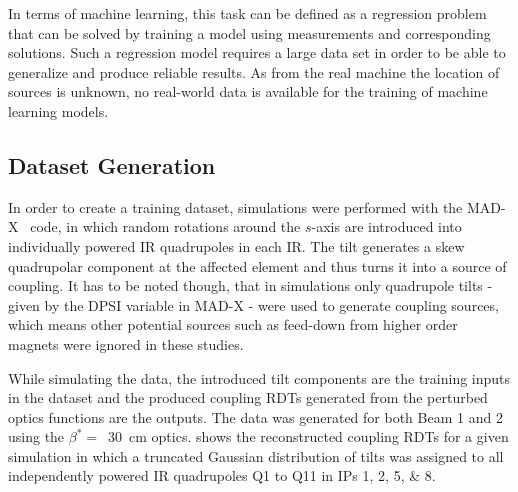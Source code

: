 In terms of machine learning, this task can be defined as a regression problem that can be solved by training a model using measurements and corresponding solutions.
Such a regression model requires a large data set in order to be able to generalize and produce reliable results.
As from the real machine the location of sources is unknown, no real-world data is available for the training of machine learning models.

\subsection{Dataset Generation}

In order to create a training dataset, simulations were performed with the MAD-X~\cite{CODE:MADX_guide} code, in which random rotations around the \(s\)-axis are introduced into individually powered IR quadrupoles in each IR.
The tilt generates a skew quadrupolar component at the affected element and thus turns it into a source of coupling.
It has to be noted though, that in simulations only quadrupole tilts - given by the \(\mathrm{DPSI}\) variable in MAD-X - were used to generate coupling sources, which means other potential sources such as feed-down from higher order magnets were ignored in these studies.

While simulating the data, the introduced tilt components are the training inputs in the dataset and the produced coupling RDTs generated from the perturbed optics functions are the outputs.
The data was generated for both Beam 1 and 2 using the \(\beta^{\ast}=\)~\qty{30}{\centi\meter} optics.
 shows the reconstructed coupling RDTs for a given simulation in which a truncated Gaussian distribution of tilts was assigned to all independently powered IR quadrupoles Q\num{1} to Q\num{11} in IPs \numlist{1;2;5;8}.

